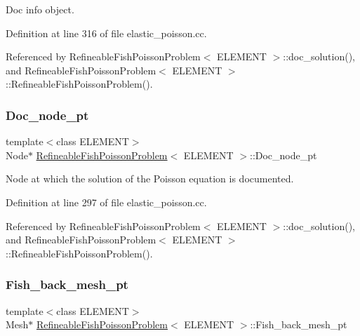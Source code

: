 Doc info object. 



Definition at line 316 of file elastic\+\_\+poisson.\+cc.



Referenced by Refineable\+Fish\+Poisson\+Problem$<$ E\+L\+E\+M\+E\+N\+T $>$\+::doc\+\_\+solution(), and Refineable\+Fish\+Poisson\+Problem$<$ E\+L\+E\+M\+E\+N\+T $>$\+::\+Refineable\+Fish\+Poisson\+Problem().

\mbox{\label{classRefineableFishPoissonProblem_afa7a846c34391fdfbc1a7cefe268152c}} 
\subsubsection{\texorpdfstring{Doc\+\_\+node\+\_\+pt}{Doc\_node\_pt}}
{\footnotesize\ttfamily template$<$class E\+L\+E\+M\+E\+NT$>$ \\
Node$\ast$ \hyperlink{classRefineableFishPoissonProblem}{Refineable\+Fish\+Poisson\+Problem}$<$ E\+L\+E\+M\+E\+NT $>$\+::Doc\+\_\+node\+\_\+pt\hspace{0.3cm}{\ttfamily [private]}}



Node at which the solution of the Poisson equation is documented. 



Definition at line 297 of file elastic\+\_\+poisson.\+cc.



Referenced by Refineable\+Fish\+Poisson\+Problem$<$ E\+L\+E\+M\+E\+N\+T $>$\+::doc\+\_\+solution(), and Refineable\+Fish\+Poisson\+Problem$<$ E\+L\+E\+M\+E\+N\+T $>$\+::\+Refineable\+Fish\+Poisson\+Problem().

\mbox{\label{classRefineableFishPoissonProblem_adcb3831cd9c21ec454ca787ced5d9db6}} 
\subsubsection{\texorpdfstring{Fish\+\_\+back\+\_\+mesh\+\_\+pt}{Fish\_back\_mesh\_pt}}
{\footnotesize\ttfamily template$<$class E\+L\+E\+M\+E\+NT$>$ \\
Mesh$\ast$ \hyperlink{classRefineableFishPoissonProblem}{Refineable\+Fish\+Poisson\+Problem}$<$ E\+L\+E\+M\+E\+NT $>$\+::Fish\+\_\+back\+\_\+mesh\+\_\+pt\hspace{0.3cm}{\ttfamily [private]}}

